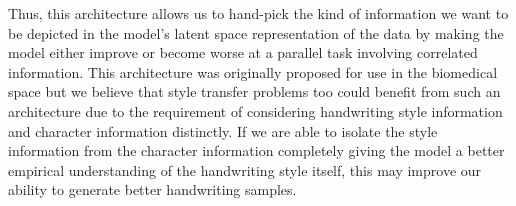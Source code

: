 \documentclass[10pt,twocolumn,letterpaper]{article}
\begin{document}
Thus, this architecture allows us to hand-pick the kind of information we want to be depicted in the model's latent space representation of the data by making the model either improve or become worse at a parallel task involving correlated information. This architecture was originally proposed for use in the biomedical space but we believe that style transfer problems too could benefit from such an architecture due to the requirement of considering handwriting style information and character information distinctly. If we are able to isolate the style information from the character information completely giving the model a better empirical understanding of the handwriting style itself, this may improve our ability to generate better handwriting samples.


{\small


}
\end{document}
